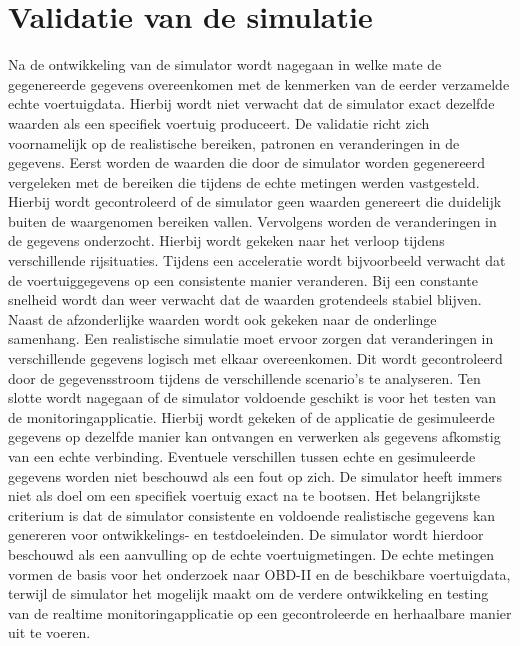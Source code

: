 \section{Validatie van de simulatie}
Na de ontwikkeling van de simulator wordt nagegaan in welke mate de gegenereerde gegevens overeenkomen met de kenmerken van de eerder verzamelde echte voertuigdata. Hierbij wordt niet verwacht dat de simulator exact dezelfde waarden als een specifiek voertuig produceert. De validatie richt zich voornamelijk op de realistische bereiken, patronen en veranderingen in de gegevens.
Eerst worden de waarden die door de simulator worden gegenereerd vergeleken met de bereiken die tijdens de echte metingen werden vastgesteld. Hierbij wordt gecontroleerd of de simulator geen waarden genereert die duidelijk buiten de waargenomen bereiken vallen.
Vervolgens worden de veranderingen in de gegevens onderzocht. Hierbij wordt gekeken naar het verloop tijdens verschillende rijsituaties. Tijdens een acceleratie wordt bijvoorbeeld verwacht dat de voertuiggegevens op een consistente manier veranderen. Bij een constante snelheid wordt dan weer verwacht dat de waarden grotendeels stabiel blijven.
Naast de afzonderlijke waarden wordt ook gekeken naar de onderlinge samenhang. Een realistische simulatie moet ervoor zorgen dat veranderingen in verschillende gegevens logisch met elkaar overeenkomen. Dit wordt gecontroleerd door de gegevensstroom tijdens de verschillende scenario's te analyseren.
Ten slotte wordt nagegaan of de simulator voldoende geschikt is voor het testen van de monitoringapplicatie. Hierbij wordt gekeken of de applicatie de gesimuleerde gegevens op dezelfde manier kan ontvangen en verwerken als gegevens afkomstig van een echte verbinding.
Eventuele verschillen tussen echte en gesimuleerde gegevens worden niet beschouwd als een fout op zich. De simulator heeft immers niet als doel om een specifiek voertuig exact na te bootsen. Het belangrijkste criterium is dat de simulator consistente en voldoende realistische gegevens kan genereren voor ontwikkelings- en testdoeleinden.
De simulator wordt hierdoor beschouwd als een aanvulling op de echte voertuigmetingen. De echte metingen vormen de basis voor het onderzoek naar OBD-II en de beschikbare voertuigdata, terwijl de simulator het mogelijk maakt om de verdere ontwikkeling en testing van de realtime monitoringapplicatie op een gecontroleerde en herhaalbare manier uit te voeren.